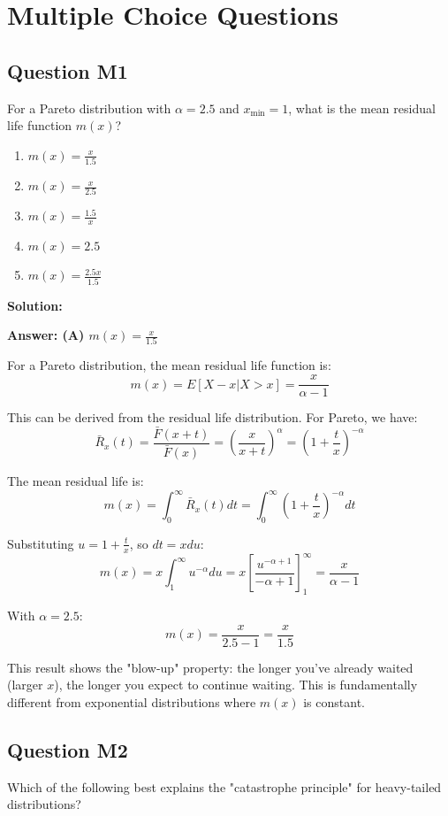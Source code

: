 \documentclass[11pt]{article}
\newenvironment{solution}
{\color{solutioncolor}\begin{framed}\textbf{Solution:}\par}
{\end{framed}}
\begin{document}
\section{Multiple Choice Questions}

\subsection{Question M1}
For a Pareto distribution with $\alpha = 2.5$ and $x_{\min} = 1$, what is the mean residual life function $m(x)$?

\begin{enumerate}[label=(\Alph*)]
\item $m(x) = \frac{x}{1.5}$
\item $m(x) = \frac{x}{2.5}$  
\item $m(x) = \frac{1.5}{x}$
\item $m(x) = 2.5$
\item $m(x) = \frac{2.5x}{1.5}$
\end{enumerate}

\begin{solution}
\textbf{Answer: (A) $m(x) = \frac{x}{1.5}$}

For a Pareto distribution, the mean residual life function is:
$$m(x) = E[X - x | X > x] = \frac{x}{\alpha - 1}$$

This can be derived from the residual life distribution. For Pareto, we have:
$$\bar{R}_x(t) = \frac{\bar{F}(x+t)}{\bar{F}(x)} = \left(\frac{x}{x+t}\right)^{\alpha} = \left(1 + \frac{t}{x}\right)^{-\alpha}$$

The mean residual life is:
$$m(x) = \int_0^{\infty} \bar{R}_x(t) dt = \int_0^{\infty} \left(1 + \frac{t}{x}\right)^{-\alpha} dt$$

Substituting $u = 1 + \frac{t}{x}$, so $dt = x du$:
$$m(x) = x \int_1^{\infty} u^{-\alpha} du = x \left[\frac{u^{-\alpha+1}}{-\alpha+1}\right]_1^{\infty} = \frac{x}{\alpha-1}$$

With $\alpha = 2.5$:
$$m(x) = \frac{x}{2.5 - 1} = \frac{x}{1.5}$$

This result shows the "blow-up" property: the longer you've already waited (larger $x$), the longer you expect to continue waiting. This is fundamentally different from exponential distributions where $m(x)$ is constant.
\end{solution}

\subsection{Question M2}
Which of the following best explains the "catastrophe principle" for heavy-tailed distributions?
\end{document}
